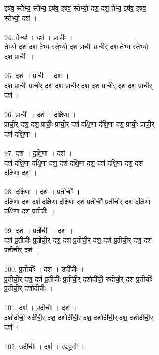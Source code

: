 इष॑व॒ स्तेभ्य॒ स्तेभ्य॒ इष॑व॒ इष॑व॒ स्तेभ्यो॒ दश॒ दश॒ तेभ्य॒ इष॑व॒ इष॑व॒\\
स्तेभ्यो॒ दश॑ ।\\
\\
94. तेभ्यः॑ । दश॑ । प्राचीः᳚ ।\\
तेभ्यो॒ दश॒ दश॒ तेभ्य॒ स्तेभ्यो॒ दश॒ प्राचीः॒ प्राची॒र् दश॒ तेभ्य॒ स्तेभ्यो॒\\
दश॒ प्राचीः᳚ ।\\
\\
95. दश॑ । प्राचीः᳚ । दश॑ ।\\
दश॒ प्राचीः॒ प्राची॒र् दश॒ दश॒ प्राची॒र् दश॒ दश॒ प्राची॒र् दश॒ दश॒ प्राची॒र्\\
दश॑ ।\\
\\
96. प्राचीः᳚ । दश॑ । द॒क्षि॒णा ।\\
प्राची॒र् दश॒ दश॒ प्राचीः॒ प्राची॒र् दश॑ दक्षि॒णा द॑क्षि॒णा दश॒ प्राचीः॒ प्राची॒र्\\
दश॑ दक्षि॒णा ।\\
\\
97. दश॑ । द॒क्षि॒णा । दश॑ ।\\
दश॑ दक्षि॒णा द॑क्षि॒णा दश॒ दश॑ दक्षि॒णा दश॒ दश॑ दक्षि॒णा दश॒ दश॑\\
दक्षि॒णा दश॑ ।\\
\\
98. द॒क्षि॒णा । दश॑ । प्र॒तीचीः᳚ ।\\
द॒क्षि॒णा दश॒ दश॑ दक्षि॒णा द॑क्षि॒णा दश॑ प्र॒तीचीः᳚ प्र॒तीची॒र् दश॑ दक्षि॒णा\\
द॑क्षि॒णा दश॑ प्र॒तीचीः᳚ ।\\
\\
99. दश॑ । प्र॒तीचीः᳚ । दश॑ ।\\
दश॑ प्र॒तीचीः᳚ प्र॒तीची॒र् दश॒ दश॑ प्र॒तीची॒र् दश॒ दश॑ प्र॒तीची॒र् दश॒ दश॑\\
प्र॒तीची॒र् दश॑ ।\\
\\
100. प्र॒तीचीः᳚ । दश॑ । उदी॑चीः ।\\
प्र॒तीची॒र् दश॒ दश॑ प्र॒तीचीः᳚ प्र॒तीची॒र् दशोदी॑ची॒ रुदी॑ची॒र् दश॑ प्र॒तीचीः᳚\\
प्र॒तीची॒र् दशोदी॑चीः ।\\
\\
101. दश॑ । उदी॑चीः । दश॑ ।\\
दशोदी॑ची॒ रुदी॑ची॒र् दश॒ दशोदी॑ची॒र् दश॒ दशोदी॑ची॒र् दश॒ दशोदी॑ची॒र्\\
दश॑ ।\\
\\
102. उदी॑चीः । दश॑ । ऊ॒र्द्ध्वाः ।\\
